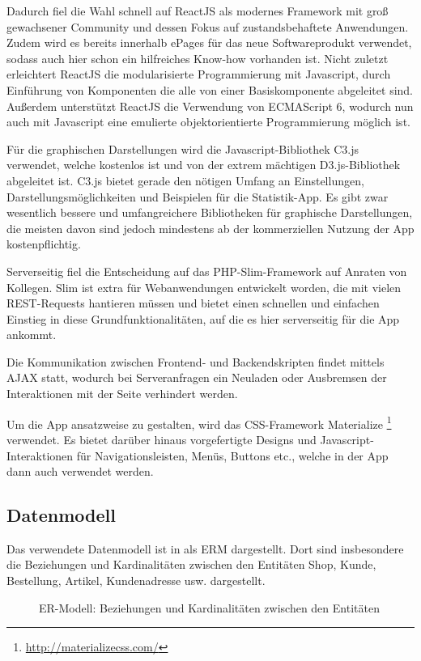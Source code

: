 Dadurch fiel die Wahl schnell auf ReactJS als modernes Framework mit groß gewachsener Community und dessen Fokus auf zustandsbehaftete Anwendungen. Zudem wird es bereits innerhalb ePages für das neue Softwareprodukt verwendet, sodass auch hier schon ein hilfreiches Know-how vorhanden ist. Nicht zuletzt erleichtert ReactJS die modularisierte Programmierung mit Javascript, durch Einführung von Komponenten die alle von einer Basiskomponente abgeleitet sind. Außerdem unterstützt ReactJS die Verwendung von ECMAScript 6, wodurch nun auch mit Javascript eine emulierte objektorientierte Programmierung möglich ist.

Für die graphischen Darstellungen wird die Javascript-Bibliothek C3.js verwendet, welche kostenlos ist und von der extrem mächtigen D3.js-Bibliothek abgeleitet ist. C3.js bietet gerade den nötigen Umfang an Einstellungen, Darstellungsmöglichkeiten und Beispielen für die Statistik-App. Es gibt zwar wesentlich bessere und umfangreichere Bibliotheken für graphische Darstellungen, die meisten davon sind jedoch mindestens ab der kommerziellen Nutzung der App kostenpflichtig.

Serverseitig fiel die Entscheidung auf das \acs{PHP}-Slim-Framework auf Anraten von Kollegen. Slim ist extra für Webanwendungen entwickelt worden, die mit vielen \acs{REST}-Requests hantieren müssen und bietet einen schnellen und einfachen Einstieg in diese Grundfunktionalitäten, auf die es hier serverseitig für die App ankommt.

Die Kommunikation zwischen Frontend- und Backendskripten findet mittels \acs{AJAX} statt, wodurch bei Serveranfragen ein Neuladen oder Ausbremsen der Interaktionen mit der Seite verhindert werden.

Um die App ansatzweise  zu gestalten, wird das \acs{CSS}-Framework Materialize \footnote{\url{http://materializecss.com/}} verwendet. Es bietet darüber hinaus vorgefertigte Designs und Javascript-Interaktionen für Navigationsleisten, Menüs, Buttons etc., welche in der App dann auch verwendet werden.

\subsection{Datenmodell}
\label{sec:Datenmodell}
Das verwendete Datenmodell ist in  als \acs{ERM} dargestellt. Dort sind insbesondere die Beziehungen und Kardinalitäten zwischen den Entitäten Shop, Kunde, Bestellung, Artikel, Kundenadresse usw. dargestellt.  
\begin{figure}[htb]
\centering
{}
\caption{ER-Modell: Beziehungen und Kardinalitäten zwischen den Entitäten}
\label{fig:erm2}
\end{figure}
